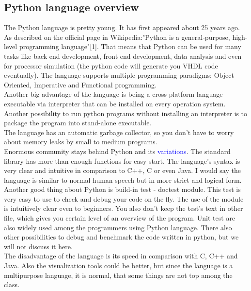\documentclass{article}
\begin{document}
\newpage
\subsection{Python language overview}
The Python language is pretty young. It has first appeared about 25 years ago. As described on the official page in Wikipedia:"Python is a general-purpose, high-level programming language"[1]. That means that Python can be used for many tasks like back end development, front end development, data analysis and even for processor simulation (the python code will generate you VHDL code eventually). The language supports multiple programming paradigms: Object Oriented, Imperative and Functional programming.\\
Another big advantage of the language is being a cross-platform language executable via interpreter that can be installed on every operation system. Another possibility to run python programs without installing an interpreter is to package the program into stand-alone executable.\\ 
The language has an automatic garbage collector, so you don't have to worry about memory leaks by small to medium programs.\\
Enormous community stays behind Python and its \textcolor{blue}{variations}. The standard library has more than enough functions for easy start. The language's syntax is very clear and intuitive in comparison to C++, C or even Java. I would say the language is similar to normal human speech but in more strict and logical form.\\
Another good thing about Python is build-in test - doctest module. This test is very easy to use to check and debug your code on the fly. The use of the module is intuitively clear even to beginners. You also don't keep the test's text in other file, which gives you certain level of an overview of the program. Unit test are also widely used among the programmers using Python language. There also other possibilities to debug and benchmark the code written in python, but we will not discuss it here.\\
The disadvantage of the language is its speed in comparison with C, C++ and Java. Also the visualization tools could be better, but since the language is a multipurpose language, it is normal, that some things are not top among the class. \\
\end{document}
